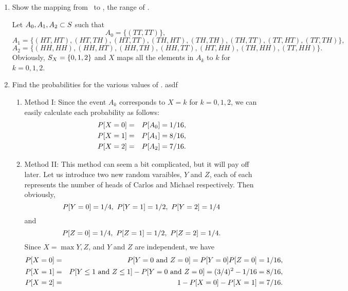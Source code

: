 \begin{enumerate}
\begin{enumerate}
		\item Show the mapping from \sspace\ to \ssx, the range of \X.
		\ifdefined\sol
		\begin{solution}
		Let $A_0, A_1, A_2 \subset S$ such that
		\[
			A_0 = \{ (TT,TT) \},
		\]
		\[
			A_1 = \{
			(HT,HT), (HT,TH), (HT,TT),
			(TH,HT), (TH,TH), (TH,TT),
			(TT,HT), (TT,TH) \},
		\]
		\[
			A_2 = \{
			(HH,HH), (HH,HT), (HH,TH), (HH,TT),
			(HT,HH),
			(TH,HH),
			(TT,HH) \}.
		\]
		Obviously, $S_X = \{0,1,2\}$
		and $X$ maps all the elements in $A_k$ to $k$
		for $k=0,1,2$.
		\end{solution}
		\fi

		\item Find the probabilities for the various values of \X.
		asdf
		\ifdefined\sol
		\begin{solution}
		\begin{enumerate}
			\item Method I: Since the event $A_k$ corresponds to $X=k$ for $k=0,1,2$,
			we can easily calculate each probability as follows:
			\begin{eqnarray*}
				P[X=0] &=& P[A_0] = 1/16,
				\\P[X=1] &=& P[A_1] = 8/16,
				\\P[X=2] &=& P[A_2] = 7/16.
			\end{eqnarray*}

			\item Method II:
			This method can seem a bit complicated, but it will pay off later.
			Let us introduce two new random varaibles, $Y$ and $Z$,
			each of each represents the number of heads of Carlos and Michael
			respectively.
			Then obviously,
			\[ P[Y=0] = 1/4,\ P[Y=1] = 1/2,\ P[Y=2] = 1/4 \]
			and
			\[ P[Z=0] = 1/4,\ P[Z=1] = 1/2,\ P[Z=2] = 1/4. \]
			Since $X = \max{Y,Z}$, and $Y$ and $Z$ are independent,
			we have
			\begin{eqnarray*}
				P[X=0] &=& P[Y=0 \mbox{ and } Z=0]
				= P[Y=0]P[Z=0] = 1/16,
				\\ P[X=1]&=&
				P[Y\leq 1 \mbox{ and } Z\leq 1] - P[Y=0 \mbox{ and } Z=0]
				= (3/4)^2 - 1/16 =  8/16,
				\\ P[X=2]&=& 1 - P[X=0] - P[X=1]
				 = 7/16.
			\end{eqnarray*}

		\end{enumerate}
		\end{solution}
		\fi


	\end{enumerate}


\end{enumerate}
